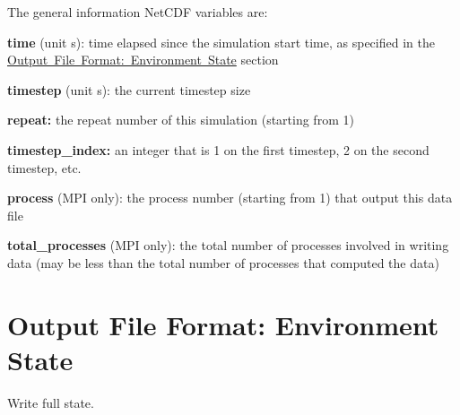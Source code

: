 The general information Net\+C\+DF variables are\+:
\begin{DoxyItemize}
\item {\bfseries time} (unit s)\+: time elapsed since the simulation start time, as specified in the \mbox{\hyperlink{output_format_env_state}{Output File Format\+: Environment State}} section
\item {\bfseries timestep} (unit s)\+: the current timestep size
\item {\bfseries repeat\+:} the repeat number of this simulation (starting from 1)
\item {\bfseries timestep\+\_\+index\+:} an integer that is 1 on the first timestep, 2 on the second timestep, etc.
\item {\bfseries process} (M\+PI only)\+: the process number (starting from 1) that output this data file
\item {\bfseries total\+\_\+processes} (M\+PI only)\+: the total number of processes involved in writing data (may be less than the total number of processes that computed the data) 
\end{DoxyItemize}\hypertarget{output_format_env_state}{}\section{Output File Format\+: Environment State}\label{output_format_env_state}
Write full state.


